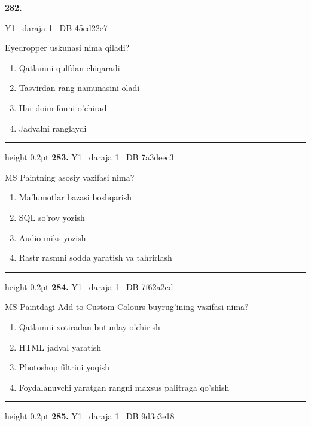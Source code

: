\documentclass[10pt,a4paper,oneside]{article}
\begin{document}
\hypertarget{q282}{\textbf{\color{ink}282.}}  {\color{muted}\scriptsize Y1 \textbullet\ daraja 1 \textbullet\ DB 45ed22e7}
\par
Eyedropper uskunasi nima qiladi?
\begin{enumerate}[label=\Alph*),leftmargin=9mm]
\item Qatlamni qulfdan chiqaradi
\item Tasvirdan rang namunasini oladi
\item Har doim fonni o'chiradi
\item Jadvalni ranglaydi
\end{enumerate}
\vspace{2mm}\hrule height 0.2pt \vspace{4mm}
\hypertarget{q283}{\textbf{\color{ink}283.}}  {\color{muted}\scriptsize Y1 \textbullet\ daraja 1 \textbullet\ DB 7a3deec3}
\par
MS Paintning asosiy vazifasi nima?
\begin{enumerate}[label=\Alph*),leftmargin=9mm]
\item Ma'lumotlar bazasi boshqarish
\item SQL so'rov yozish
\item Audio miks yozish
\item Rastr rasmni sodda yaratish va tahrirlash
\end{enumerate}
\vspace{2mm}\hrule height 0.2pt \vspace{4mm}
\hypertarget{q284}{\textbf{\color{ink}284.}}  {\color{muted}\scriptsize Y1 \textbullet\ daraja 1 \textbullet\ DB 7f62a2ed}
\par
MS Paintdagi Add to Custom Colours buyrug'ining vazifasi nima?
\begin{enumerate}[label=\Alph*),leftmargin=9mm]
\item Qatlamni xotiradan butunlay o'chirish
\item HTML jadval yaratish
\item Photoshop filtrini yoqish
\item Foydalanuvchi yaratgan rangni maxsus palitraga qo'shish
\end{enumerate}
\vspace{2mm}\hrule height 0.2pt \vspace{4mm}
\hypertarget{q285}{\textbf{\color{ink}285.}}  {\color{muted}\scriptsize Y1 \textbullet\ daraja 1 \textbullet\ DB 9d3c3e18}
\par
\end{document}
